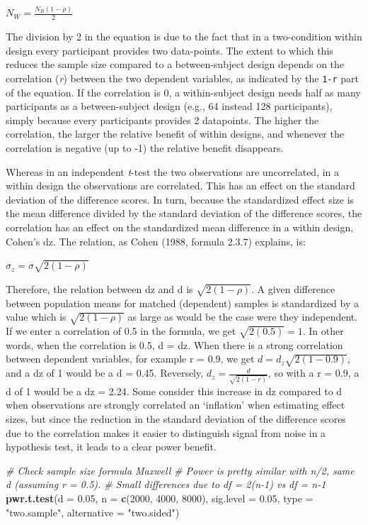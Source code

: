 \documentclass[]{book}
\newenvironment{Shaded}{\begin{snugshade}}{\end{snugshade}}
\newcommand{\CommentTok}[1]{\textcolor[rgb]{0.56,0.35,0.01}{\textit{#1}}}
\newcommand{\DataTypeTok}[1]{\textcolor[rgb]{0.13,0.29,0.53}{#1}}
\newcommand{\DecValTok}[1]{\textcolor[rgb]{0.00,0.00,0.81}{#1}}
\newcommand{\FloatTok}[1]{\textcolor[rgb]{0.00,0.00,0.81}{#1}}
\newcommand{\KeywordTok}[1]{\textcolor[rgb]{0.13,0.29,0.53}{\textbf{#1}}}
\newcommand{\NormalTok}[1]{#1}
\newcommand{\StringTok}[1]{\textcolor[rgb]{0.31,0.60,0.02}{#1}}
\begin{document}
\(N_{W}=\frac{N_{B}(1-\rho)}{2}\)

The division by 2 in the equation is due to the fact that in a two-condition within design every participant provides two data-points. The extent to which this reduces the sample size compared to a between-subject design depends on the correlation (\emph{r}) between the two dependent variables, as indicated by the \texttt{1-r} part of the equation. If the correlation is 0, a within-subject design needs half as many participants as a between-subject design (e.g., 64 instead 128 participants), simply because every participants provides 2 datapoints. The higher the correlation, the larger the relative benefit of within designs, and whenever the correlation is negative (up to -1) the relative benefit disappears.

Whereas in an independent \emph{t}-test the two observations are uncorrelated, in a within design the observations are correlated. This has an effect on the standard deviation of the difference scores. In turn, because the standardized effect size is the mean difference divided by the standard deviation of the difference scores, the correlation has an effect on the standardized mean difference in a within design, Cohen's dz. The relation, as Cohen (1988, formula 2.3.7) explains, is:

\(\sigma_{z}=\sigma\sqrt{2(1-\rho)}\)

Therefore, the relation between dz and d is \(\sqrt{2(1-\rho)}\). A given difference between population means for matched (dependent) samples is standardized by a value which is \(\sqrt{2(1-\rho)}\) as large as would be the case were they independent. If we enter a correlation of 0.5 in the formula, we get \(\sqrt{2(0.5)}=1\). In other words, when the correlation is 0.5, d = dz. When there is a strong correlation between dependent variables, for example r = 0.9, we get \(d=d_{z}\sqrt{2(1-0.9)}\), and a dz of 1 would be a d = 0.45. Reversely, \(d_{z}=\frac{d}{\sqrt{2(1-r)}}\), so with a r = 0.9, a d of 1 would be a dz = 2.24. Some consider this increase in dz compared to d when observations are strongly correlated an `inflation' when estimating effect sizes, but since the reduction in the standard deviation of the difference scores due to the correlation makes it easier to distinguish signal from noise in a hypothesis test, it leads to a clear power benefit.

\begin{Shaded}
\begin{Highlighting}[]
\CommentTok{# Check sample size formula Maxwell}
\CommentTok{# Power is pretty similar with n/2, same d (assuming r = 0.5). }
\CommentTok{# Small differences due to df = 2(n-1) vs df = n-1}
\KeywordTok{pwr.t.test}\NormalTok{(}\DataTypeTok{d =} \FloatTok{0.05}\NormalTok{,}
           \DataTypeTok{n =} \KeywordTok{c}\NormalTok{(}\DecValTok{2000}\NormalTok{, }\DecValTok{4000}\NormalTok{, }\DecValTok{8000}\NormalTok{),}
           \DataTypeTok{sig.level =} \FloatTok{0.05}\NormalTok{,}
           \DataTypeTok{type =} \StringTok{"two.sample"}\NormalTok{,}
           \DataTypeTok{alternative =} \StringTok{"two.sided"}\NormalTok{)}
\end{Highlighting}
\end{Shaded}
\end{document}
